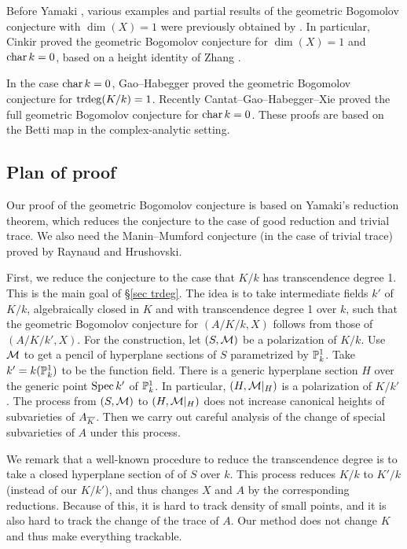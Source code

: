 \documentclass[12pt]{amsart}
\begin{document}
Before Yamaki \cite{Yamaki2017}, various examples and partial results of the geometric Bogomolov conjecture with $\dim(X)=1$ were previously obtained by \cite{Parshin, Moriwaki1996, Moriwaki1997, Moriwaki1998, Yamaki2002, Yamaki2008, Faber2009, Cinkir2011}.
In particular, Cinkir \cite{Cinkir2011} proved the geometric Bogomolov conjecture for 
$\dim(X)=1$ and $\Char k=0$, based on a height identity of Zhang \cite{Zhang2010}.

In the case $\Char k=0$, Gao--Habegger  \cite{Gao2019} proved the geometric Bogomolov conjecture for $\trdeg(K/k)=1$. 
Recently Cantat--Gao--Habegger--Xie \cite{Cantat2021} proved the full geometric Bogomolov conjecture for $\Char k=0$. 
These proofs are based on the Betti map in the complex-analytic setting.





\subsection{Plan of proof}

Our proof of the geometric Bogomolov conjecture is based on Yamaki's reduction theorem, which reduces the conjecture to the case of good reduction and trivial trace.
We also need the Manin--Mumford conjecture (in the case of trivial trace) proved by Raynaud and Hrushovski.

First, we reduce the conjecture to the case that $K/k$ has transcendence degree 1. This is the main goal of \S\ref{sec trdeg}.
The idea is to take intermediate fields $k'$ of $K/k$, algebraically closed in $K$ and with transcendence degree 1 over $k$, such that the geometric Bogomolov conjecture for $(A/K/k,X)$ follows from those of $(A/K/k',X)$.
For the construction, let $(S,\sM)$ be a polarization of $K/k$.
Use $\sM$ to get a pencil of hyperplane sections of $S$ 
parametrized by $\P_k^1$. Take $k'=k(\P_k^1)$ to be the function field.
There is a generic hyperplane section $H$ over the generic point $\Spec k'$ of $\P_k^1$. 
In particular, $(H,\sM|_H)$ is a polarization of $K/k'$.  
The process from $(S,\sM)$ to $(H,\sM|_H)$ does not increase canonical heights of subvarieties of $A_\OK$. 
Then we carry out careful analysis of the change of special subvarieties of $A$ under this process.

We remark that a well-known procedure to reduce the transcendence degree is to take a closed hyperplane section of 
of $S$ over $k$. This process reduces $K/k$ to $K'/k$ (instead of our $K/k'$), and thus changes $X$ and $A$ by the corresponding reductions. Because of this, it is hard to track density of small points, and it is also hard to track the change of the trace of $A$.
Our method does not change $K$ and thus make everything trackable.
\end{document}
